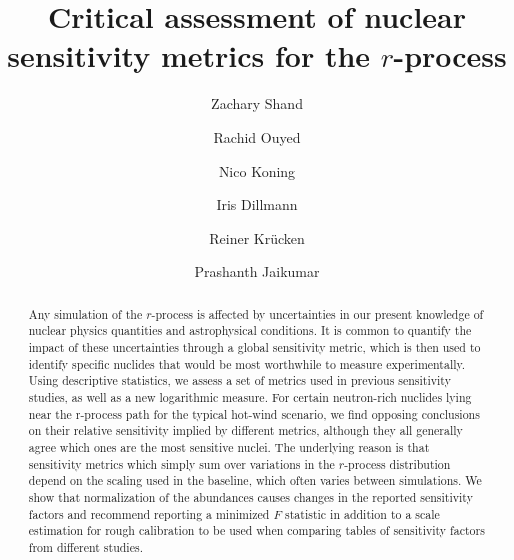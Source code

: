 \documentclass[aps,prc,reprint,showpacs,floatfix,nofootinbib]{revtex4-1}
\begin{document}
\begin{CJK*}{GB}{} %
\title{Critical assessment of nuclear sensitivity metrics for the $r$-process}
\author{Zachary Shand}
\author{Rachid Ouyed}
\author{Nico Koning}

\author{Iris Dillmann}

\author{Reiner Kr\"{u}cken}


\author{Prashanth Jaikumar}


\begin{abstract}
Any simulation of the $r$-process is affected by uncertainties in our present knowledge of nuclear physics quantities and astrophysical conditions. It is common to quantify the impact of these uncertainties through a global sensitivity metric, which is then used to identify specific nuclides that would be most worthwhile to measure experimentally. Using descriptive statistics, we assess a set of metrics used in previous sensitivity studies, as well as a new logarithmic measure. For certain neutron-rich nuclides lying near the r-process path for the typical hot-wind scenario, we find opposing conclusions on their relative sensitivity implied by different metrics, although they all generally agree which ones are the most sensitive nuclei. The underlying reason is that sensitivity metrics which simply sum over variations in the $r$-process distribution depend on the scaling used in the baseline, which often varies between simulations. We show that normalization of the abundances causes changes in 
the reported sensitivity factors and recommend reporting a minimized 
$F$ statistic in addition to a scale estimation for rough calibration 
to be used when comparing tables of sensitivity factors from different studies. 
\end{abstract}

\maketitle

\end{CJK*}
\end{document}
